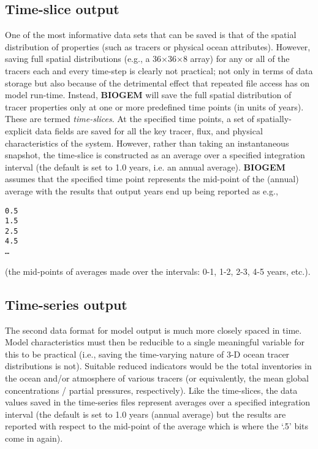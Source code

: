 \documentclass[11pt,fleqn]{book} %
\begin{document}

\subsection{Time-slice output}

One of the most informative data sets that can be saved is that of the spatial distribution of properties (such as tracers or physical ocean attributes). However, saving full spatial distributions (e.g., a 36\(\times\)36\(\times\)8 array) for any or all of the tracers each and every time-step is clearly not practical; not only in terms of data storage but also because of the detrimental effect that repeated file access has on model run-time.
Instead, \textbf{BIOGEM} will save the full spatial distribution of tracer properties only at one or more predefined time points (in units of years). These are termed \textit{time-slices}. At the specified time points, a set of spatially-explicit data fields are saved for all the key tracer, flux, and physical characteristics of the system. However, rather than taking an instantaneous snapshot, the time-slice is constructed as an average over a specified integration interval (the default is set to 1.0 years, i.e. an annual average). \textbf{BIOGEM}  assumes that the specified time point represents the mid-point of the (annual) average with the results that output years end up being reported as e.g.,
\begin{verbatim}
0.5
1.5
2.5 
4.5
…
\end{verbatim}
(the mid-points of averages made over the intervals: 0-1, 1-2, 2-3, 4-5 years, etc.).


\subsection{Time-series output}

The second data format for model output is much more closely spaced in time. Model characteristics must then be reducible to a single meaningful variable for this to be practical (i.e., saving the time-varying nature of 3-D ocean tracer distributions is not). Suitable reduced indicators would be the total inventories in the ocean and/or atmosphere of various tracers (or equivalently, the mean global concentrations / partial pressures, respectively). Like the time-slices, the data values saved in the time-series files represent averages over a specified integration interval (the default is set to 1.0 years (annual average) but the results are reported with respect to the mid-point of the average which is where the ‘.5’ bits come in again).
\end{document}
